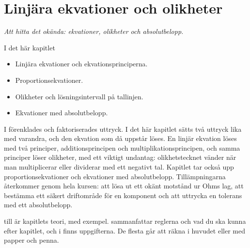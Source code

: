 
\chapter{Linjära ekvationer och olikheter}
\label{c3:ch}

{\large\itshape Att hitta det okända: ekvationer, olikheter och absolutbelopp.\par}

\begin{chapterbox}{I det här kapitlet}
\begin{itemize}
  \item Linjära ekvationer och ekvationsprinciperna.
  \item Proportionsekvationer.
  \item Olikheter och lösningsintervall på tallinjen.
  \item Ekvationer med absolutbelopp.
\end{itemize}
\end{chapterbox}

I  förenklades och faktoriserades uttryck. I det här kapitlet sätts två uttryck lika med
varandra, och den ekvation som då uppstår löses. En linjär ekvation löses med två principer,
additionsprincipen och multiplikationsprincipen, och samma principer löser olikheter, med ett
viktigt undantag: olikhetstecknet vänder när man multiplicerar eller dividerar med ett negativt tal.
Kapitlet tar också upp proportionsekvationer och ekvationer med absolutbelopp. Tillämpningarna
återkommer genom hela kursen: att lösa ut ett okänt motstånd ur Ohms lag, att bestämma ett säkert
driftområde för en komponent och att uttrycka en tolerans med ett absolutbelopp.

 till  är kapitlets teori, med exempel.
 sammanfattar reglerna och vad du ska kunna efter kapitlet, och i
 finns uppgifterna. De flesta går att räkna i huvudet eller med papper och
penna.




